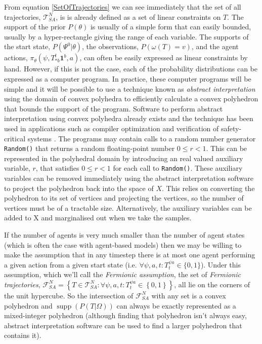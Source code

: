 \documentclass{article}
\DeclareMathOperator\supp{supp}
\begin{document}
From equation \ref{SetOfTrajectories} we can see immediately that the set of all trajectories, $\mathcal{T}^N_{SA}$, is is already defined as a set of linear constraints on $T$. The support of the prior $P(\theta)$ is usually of a simple form that can easily bounded, usually by a hyper-rectangle giving the range of each variable. The supports of the start state, $P(\Psi^0|\theta)$, the observations, $P(\omega(T)=v)$, and the agent actions, $\pi_\theta(\psi,T^t_{*b}\mathbf{1}^b,a)$, can often be easily expressed as linear constraints by hand. However, if this is not the case, each of the probability distributions can be expressed as a computer program. In practice, these computer programs will be simple and it will be possible to use a technique known as \textit{abstract interpretation} \citep{cousot1977abstract} using the domain of convex polyhedra \citep*{cousot1978automatic, becchi2018efficient, fukuda2020polyhedral} to efficiently calculate a convex polyhedron that bounds the support of the program. Software to perform abstract interpretation using convex polyhedra already exists \citep*{henry2012pagai, GN2021, jeannet2009apron, bagnara2008parma} and the technique has been used in applications such as compiler optimization \citep{nsjodin2009design} and verification of safety-critical systems \citep{halbwachs1997verification}. The programs may contain calls to a random number generator \texttt{Random()} that returns a random floating-point number $0 \le r < 1$. This can be represented in the polyhedral domain by introducing an real valued auxiliary variable, $r$, that satisfies $0 \le r < 1$ for each call to \texttt{Random()}. These auxiliary variables can be removed immediately using the abstract interpretation software to project the polyhedron back into the space of $X$. This relies on converting the polyhedron to its set of vertices \citep{motzkin1953double} and projecting the vertices, so the number of vertices must be of a tractable size. Alternatively, the auxiliary variables can be added to X and marginalised out when we take the samples.

If the number of agents is very much smaller than the number of agent states (which is often the case with agent-based models) then we may be willing to make the assumption that in any timestep there is at most one agent performing a given action from a given start state (i.e. $\forall \psi, a, t: T^{\psi a}_t \in \{0,1\}$). Under this assumption, which we'll call the \textit{Fermionic assumption}, the set of \textit{Fermionic trajectories}, $\mathcal{F}^N_{SA} = \left\{T\in\mathcal{T}^N_{SA}: \forall \psi, a, t: T^{\psi a}_t \in \left\{0,1\right\}\right\}$, all lie on the corners of the unit hypercube. So the intersection of $\mathcal{F}^N_{SA}$ with any set is a convex polyhedron and $\supp(P(T|\Omega))$ can always be exactly represented as a mixed-integer polyhedron (although finding that polyhedron isn't always easy, abstract interpretation software can be used to find a larger polyhedron that contains it).
\end{document}

